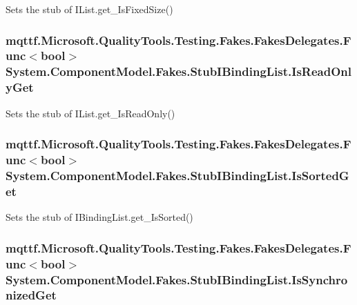 Sets the stub of I\-List.\-get\-\_\-\-Is\-Fixed\-Size()

\hypertarget{class_system_1_1_component_model_1_1_fakes_1_1_stub_i_binding_list_a6f23042591f8825f59e3b5e017ff2492}{
\subsubsection[{Is\-Read\-Only\-Get}]{\setlength{\rightskip}{0pt plus 5cm}mqttf.\-Microsoft.\-Quality\-Tools.\-Testing.\-Fakes.\-Fakes\-Delegates.\-Func$<$bool$>$ System.\-Component\-Model.\-Fakes.\-Stub\-I\-Binding\-List.\-Is\-Read\-Only\-Get}}\label{class_system_1_1_component_model_1_1_fakes_1_1_stub_i_binding_list_a6f23042591f8825f59e3b5e017ff2492}


Sets the stub of I\-List.\-get\-\_\-\-Is\-Read\-Only()

\hypertarget{class_system_1_1_component_model_1_1_fakes_1_1_stub_i_binding_list_a1b59125b4788252979ffd1b1e35eb085}{
\subsubsection[{Is\-Sorted\-Get}]{\setlength{\rightskip}{0pt plus 5cm}mqttf.\-Microsoft.\-Quality\-Tools.\-Testing.\-Fakes.\-Fakes\-Delegates.\-Func$<$bool$>$ System.\-Component\-Model.\-Fakes.\-Stub\-I\-Binding\-List.\-Is\-Sorted\-Get}}\label{class_system_1_1_component_model_1_1_fakes_1_1_stub_i_binding_list_a1b59125b4788252979ffd1b1e35eb085}


Sets the stub of I\-Binding\-List.\-get\-\_\-\-Is\-Sorted()

\hypertarget{class_system_1_1_component_model_1_1_fakes_1_1_stub_i_binding_list_a2486e5d17cb69433af0fcf1b7f7c2005}{
\subsubsection[{Is\-Synchronized\-Get}]{\setlength{\rightskip}{0pt plus 5cm}mqttf.\-Microsoft.\-Quality\-Tools.\-Testing.\-Fakes.\-Fakes\-Delegates.\-Func$<$bool$>$ System.\-Component\-Model.\-Fakes.\-Stub\-I\-Binding\-List.\-Is\-Synchronized\-Get}}\label{class_system_1_1_component_model_1_1_fakes_1_1_stub_i_binding_list_a2486e5d17cb69433af0fcf1b7f7c2005}


